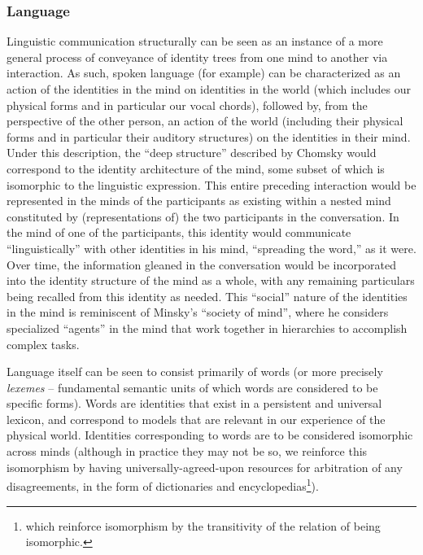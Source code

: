 \documentclass[pra,twocolumn,groupedaddress,10pt]{revtex4}
\theoremstyle{definition}
\begin{document}
\subsubsection{Language} \label{sec:language}

Linguistic communication structurally can be seen as an instance of a more general process of conveyance of identity trees from one mind to another via interaction. As such, spoken language (for example) can be characterized as an action of the identities in the mind on identities in the world (which includes our physical forms and in particular our vocal chords), followed by, from the perspective of the other person, an action of the world (including their physical forms and in particular their auditory structures) on the identities in their mind. Under this description, the ``deep structure'' described by Chomsky\cite{chomsky} would correspond to the identity architecture of the mind, some subset of which is isomorphic to the linguistic expression. This entire preceding interaction would be represented in the minds of the participants as existing within a nested mind constituted by (representations of) the two participants in the conversation. In the mind of one of the participants, this identity would communicate ``linguistically'' with other identities in his mind, ``spreading the word,'' as it were. Over time, the information gleaned in the conversation would be incorporated into the identity structure of the mind as a whole, with any remaining particulars being recalled from this identity as needed. This ``social'' nature of the identities in the mind is reminiscent of Minsky's ``society of mind''\cite{minsky}, where he considers specialized ``agents'' in the mind that work together in hierarchies to accomplish complex tasks.


Language itself can be seen to consist primarily of words (or more precisely \textit{lexemes} -- fundamental semantic units of which words are considered to be specific forms). Words are identities that exist in a persistent and universal lexicon, and correspond to models that are relevant in our experience of the physical world. Identities corresponding to words are to be considered isomorphic across minds (although in practice they may not be so, we reinforce this isomorphism by having universally-agreed-upon resources for arbitration of any disagreements, in the form of dictionaries and encyclopedias\footnote{which reinforce isomorphism by the transitivity of the relation of being isomorphic.}).
\end{document}
